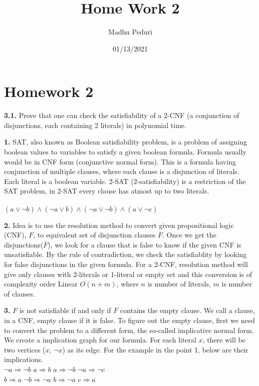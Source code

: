 \documentclass [12pt]{article}
\title{Home Work 2}
\author{Madhu Peduri}
\date{01/13/2021}
\theoremstyle{definition}
\begin{document}
\section*{Homework 2}

{\bf 3.1.} Prove that one can check the satisfiability of a 2-CNF (a conjunction of disjunctions, each containing 2 literals) in polynomial time.

\phantom{1em} {\bf 1.} SAT, also known as Boolean satisfiability problem, is a problem of assigning boolean values to variables to satisfy a given boolean formula. Formula usually would be in CNF form (conjunctive normal form). This is a formula having conjunction of multiple clauses, where each clause is a disjunction of literals. Each literal is a boolean variable. 2-SAT (2-satisfiability) is a restriction of the SAT problem, in 2-SAT every clause has atmost up to two literals.\\\\
\phantom{100cm} $(a \lor \neg b) \land (\neg a \lor b) \land (\neg a \lor \neg b) \land (a \lor \neg c)$

\phantom{1em} {\bf 2.} Idea is to use the resolution method to convert given propositional logic (CNF), $F$, to equivalent set of disjunction clauses $\overline F$. Once we get the disjunctions($\overline F$), we look for a clause that is false to know if the given CNF is unsatisfiable. By the rule of contradiction, we check the satisfiablity by looking for false disjunctions in the given formula. For a 2-CNF, resolution method will give only clauses with 2-literals or 1-literal or empty set and this conversion is of complexity order Linear $O(n + m)$, where $n$ is number of literals, $m$ is number of clauses. 

\phantom{1em} {\bf 3.} $F$ is not satisfiable if and only if $\overline F$ contains the empty clause. We call a clause, in a CNF, empty clause if it is false. To figure out the empty clause, first we need to convert the problem to a different form, the so-called implicative normal form. We create a implication graph for our formula. For each literal $x$, there will be two vertices ($x$, $\neg x$) as its edge. For the example in the point 1, below are their implications.\\
\phantom{100cm}$\neg a \Rightarrow \neg b$ \phantom{100cm} $a \Rightarrow b$ \phantom{100cm} $a \Rightarrow \neg b$ \phantom{100cm} $\neg a \Rightarrow \neg c$ \\
\phantom{100cm}$b  \Rightarrow a$ \phantom{100cm} $\neg b  \Rightarrow \neg a$ \phantom{100cm} $b \Rightarrow \neg a$ \phantom{100cm} $ c \Rightarrow a$ 
\end{document}
